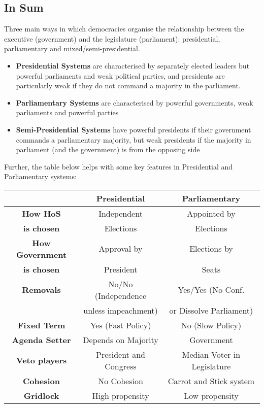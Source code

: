\documentclass[12pt, letterpaper]{article}
\begin{document}
\subsection{In Sum}
Three main ways in which democracies organise the relationship between the executive (government) and the legislature (parliament): presidential, parliamentary and mixed/semi-presidential.
\begin{itemize}
	\item \textbf{Presidential Systems} are characterised by separately elected leaders but powerful parliaments and weak political parties, and presidents are particularly weak if they do not command a majority in the parliament.
	\item \textbf{Parliamentary Systems} are characterised by powerful governments, weak parliaments and powerful parties
	\item \textbf{Semi-Presidential Systems} have powerful presidents if their government commands a parliamentary majority, but weak presidents if the majority in parliament (and the government) is from the opposing side
\end{itemize}
Further, the table below helps with some key features in Presidential and Parliamentary systems:
\begin{center}
	\begin{tabular}{c|c|c}
		& Presidential & Parliamentary\\
		\hline
		\textbf{How HoS} & Independent & Appointed by\\
		\textbf{is chosen} & Elections & Elections\\
		\textbf{How Government} & Approval by & Elections by\\
		\textbf{is chosen} & President & Seats\\
		\textbf{Removals} & No/No (Independence & Yes/Yes (No Conf.\\
			 & unless impeachment) & or Dissolve Parliament)\\
		\textbf{Fixed Term} & Yes (Fast Policy) & No (Slow Policy)\\
		\textbf{Agenda Setter} & Depends on Majority & Government\\
		\textbf{Veto players} & President and Congress & Median Voter in Legislature\\
		\textbf{Cohesion} & No Cohesion & Carrot and Stick system\\
		\textbf{Gridlock} & High propensity & Low propensity
	\end{tabular}
\end{center}
\end{document}
